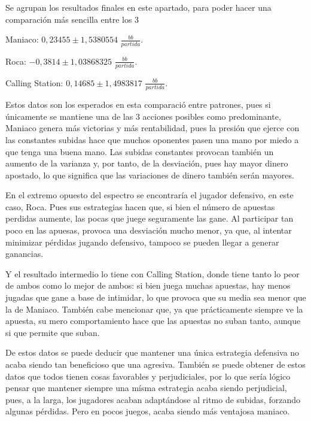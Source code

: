 Se agrupan los resultados finales en este apartado, para poder hacer una comparación más sencilla entre los 3

\vspace{5mm} %

Maniaco:  $0,23455\pm1,5380554$ $\frac{bb}{partida}$.

Roca: $-0,3814\pm1,03868325$ $\frac{bb}{partida}$.

Calling Station: $ 0,14685\pm1,4983817 $ $\frac{bb}{partida}$.

\vspace{5mm} %
Estos datos son los esperados en esta comparació entre patrones, pues si únicamente se mantiene una de las 3 acciones posibles como predominante, Maniaco genera más victorias y más rentabilidad, pues la presión que ejerce con las constantes subidas hace que muchos oponentes pasen una mano por miedo a que tenga una buena mano. Las subidas constantes provocan también un aumento de la varianza y, por tanto, de la desviación, pues hay mayor dinero apostado, lo que significa que las variaciones de dinero también serán mayores.

En el extremo opuesto del espectro se encontraría el jugador defensivo, en este caso, Roca. Pues sus estrategias hacen que, si bien el número de apuestas perdidas aumente, las pocas que  juege seguramente las gane. Al participar tan poco en las apuesas, provoca una desviación mucho menor, ya que, al intentar minimizar pérdidas jugando defensivo, tampoco se pueden llegar a generar ganancias. 

Y el resultado intermedio lo tiene con Calling Station, donde tiene tanto lo peor de ambos como lo mejor de ambos: si bien juega muchas apuestas, hay menos jugadas que gane a base de intimidar, lo que provoca que su media sea menor que la de Maniaco. También cabe mencionar que, ya que prácticamente siempre ve la  apuesta, su mero comportamiento hace que las apuestas no suban tanto, aunque si que permite que suban.

De estos datos se puede deducir que mantener una única estrategia defensiva no acaba siendo tan beneficioso que una agresiva. También se puede obtener de estos datos que todos tienen cosas favorables y perjudiciales, por lo que sería lógico pensar que mantener siempre una mísma estrategia acaba siendo perjudicial, pues, a la larga, los jugadores acaban adaptándose al ritmo de subidas, forzando algunas pérdidas. Pero en pocos juegos, acaba siendo más ventajosa maniaco.

